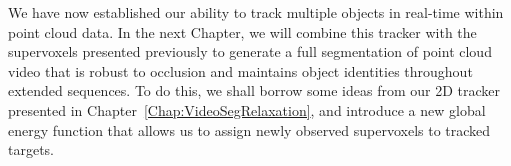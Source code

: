 We have now established our ability to track multiple objects in real-time within point cloud data. In the next Chapter, we will combine this tracker with the supervoxels presented previously to generate a full segmentation of point cloud video that is robust to occlusion and maintains object identities throughout extended sequences. To do this, we shall borrow some ideas from our 2D tracker presented in Chapter~\ref{Chap:VideoSegRelaxation}, and introduce a new global energy function that allows us to assign newly observed supervoxels to tracked targets.

